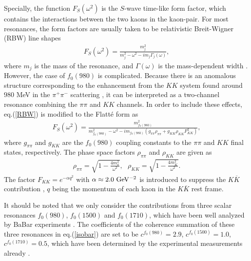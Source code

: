 \documentclass[11pt]{article}
\begin{document}
Specially, the function $F_S(\omega^2)$ is the $S$-wave time-like form factor, which contains the interactions between the two kaons in the kaon-pair. For most resonances, the form factors are usually taken to be relativistic Breit-Wigner (RBW) line shapes \cite{Zyla:2020zbs}
\begin{eqnarray}
F_S(\omega^2)=\frac{m_j^2}{m_j^2-\omega^2-im_j\Gamma_j(\omega)},\label{RBW}
\end{eqnarray}
where $m_j$ is the mass of the resonance, and $\Gamma(\omega)$ is the mass-dependent width \cite{Blatt:1952ije, Zyla:2020zbs}. However, the case of $f_0(980)$ is complicated. Because there is an anomalous structure corresponding to the enhancement from the $KK$ system found around $980$ MeV in the $\pi^+\pi^-$ scattering \cite{AlstonGarnjost:1971kv, Flatte:1972rz}, it can be interpreted as a two-channel resonance combining the $\pi\pi$ and $KK$ channels. In order to include these effects, eq.(\ref{RBW}) is modified to the Flatt\'{e} form \cite{Flatte:1976xu, Bugg:2008ig, Aaij:2014emv} as
\begin{eqnarray}\label{Flatte form}
F_S(\omega^2)=\frac{m_{f_0(980)}^2}{m_{f_0(980)}^2-\omega^2
-im_{f_0(980)}(g_{\pi\pi}\rho_{\pi\pi}+g_{KK}\rho_{KK}F_{KK}^2)},
\end{eqnarray}
where $g_{\pi\pi}$ and $g_{KK}$ are the $f_0(980)$ coupling constants to the $\pi\pi$ and $KK$ final states, respectively. The phase space factors $\rho_{\pi\pi}$ and $\rho_{KK}$ are given as
\begin{eqnarray}
\rho_{\pi\pi}=\sqrt{1-\frac{4m_\pi^2}{\omega^2}},\,\,\,\,
\rho_{KK}=\sqrt{1-\frac{4m_K^2}{\omega^2}}.
\end{eqnarray}
The factor $F_{KK}=e^{-\alpha q^2}$ with $\alpha \approx 2.0 ~\rm GeV^{-2} $ is introduced to suppress the $K\overline K$ contribution \cite{Aaij:2014emv}, $q$ being the momentum of each kaon in the  $K\overline K$ rest frame.

It should be noted that we only consider the contributions from three scalar resonances $f_0(980)$, $f_0(1500)$ and $f_0(1710)$, which have been well analyzed by BaBar experiments \cite{Lees:2012kxa,Lees:2011nf}. The coefficients of the coherence summation of these three resonances in eq.(\ref{isobar}) are set to be $c^{f_0(980)}=2.9$, $c^{f_0(1500)}=1.0$, $c^{f_0(1710)}=0.5$, which have been determined by the experimental measurements already \cite{Lees:2012kxa, Lees:2011nf}.
\end{document}
